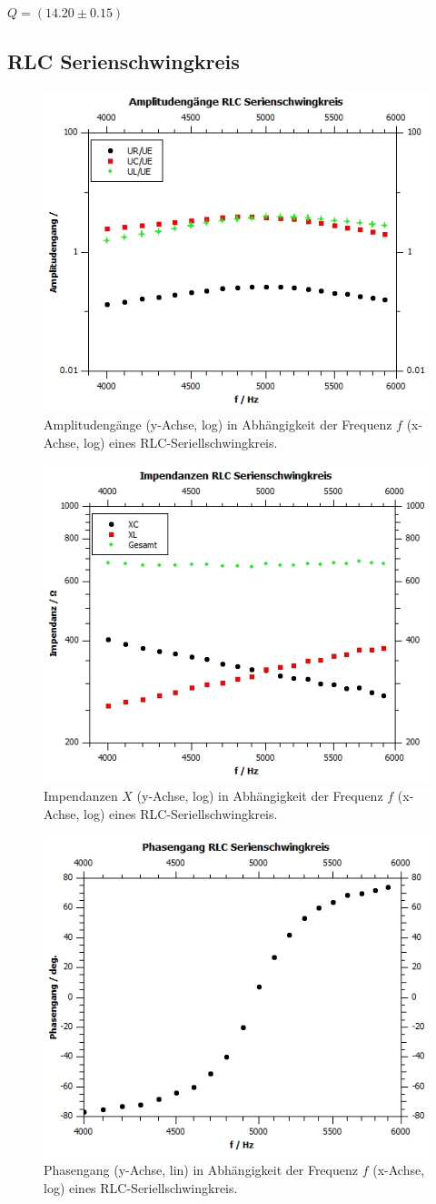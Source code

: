 \documentclass[12pt,a4paper,twoside]{article}
\begin{document}
\noindent
$Q = (14.20 \pm 0.15)$

\subsection{RLC Serienschwingkreis}

\begin{figure}[H]
    \centering
    \includegraphics[width=0.6\linewidth]{nudes/Plot a4 amp.jpg}
    \caption{Amplitudengänge (y-Achse, log) in Abhängigkeit der Frequenz $f$ (x-Achse, log) eines RLC-Seriellschwingkreis. }
    \label{fig:zus a4 amp} 
\end{figure}

\begin{figure}[H]
    \centering
    \includegraphics[width=0.6\linewidth]{nudes/Plot a4 imp.jpg}
    \caption{Impendanzen $X$ (y-Achse, log) in Abhängigkeit der Frequenz $f$ (x-Achse, log) eines RLC-Seriellschwingkreis. }
    \label{fig:zus a4 imp} 
\end{figure}

\begin{figure}[H]
    \centering
    \includegraphics[width=0.6\linewidth]{nudes/Plot a4 ph.jpg}
    \caption{Phasengang (y-Achse, lin) in Abhängigkeit der Frequenz $f$ (x-Achse, log) eines RLC-Seriellschwingkreis. }
    \label{fig:zus a4 ph} 
\end{figure}

\printbibliography[heading=bibintoc]
\end{document}
